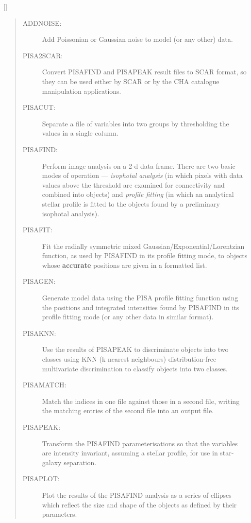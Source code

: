\vspace{-10mm}

\hfill []

\vspace{2mm}

\begin{quote}
\begin{description}

\item [ADDNOISE:] 
 Add Poissonian or Gaussian noise to model (or any other) data.

\item [PISA2SCAR:] 
 Convert PISAFIND and PISAPEAK result files to SCAR format, so they can be
 used either by SCAR or by the CHA catalogue manipulation applications.

\item [PISACUT:] 
 Separate a file of variables into two groups by thresholding the values in a
 single column.

\item [PISAFIND:] 
 Perform image analysis on a 2-d data frame.
 There are two basic modes of operation --- {\em isophotal analysis} (in which
 pixels  with data values above the threshold are examined for connectivity and
 combined into objects) and {\em profile fitting} (in which an analytical
 stellar profile is fitted to the objects found by a preliminary isophotal
 analysis).

\item [PISAFIT:] 
 Fit the radially symmetric mixed Gaussian/Exponential/Lorentzian function,
 as used by PISAFIND in its profile fitting mode, to objects whose
 {\bf accurate} positions are given in a formatted list.

\item [PISAGEN:] 
 Generate model data using the PISA profile fitting function using the positions
 and integrated intensities found by PISAFIND in its profile fitting mode (or
 any other data in similar format).

\item [PISAKNN:] 
 Use the results of PISAPEAK to discriminate objects into two classes using
 KNN (k nearest neighbours) distribution-free multivariate discrimination to
 classify objects into two classes.

\item [PISAMATCH:] 
 Match the indices in one file against those in a second file, writing the
 matching entries of the second file into an output file.

\item [PISAPEAK:] 
 Transform the PISAFIND parameterisations so that the variables are intensity
 invariant, assuming a stellar profile, for use in star-galaxy separation.

\item [PISAPLOT:] 
 Plot the results of the PISAFIND analysis as a series of ellipses which
 reflect the size and shape of the objects as defined by their parameters.

\end{description}
\end{quote}

